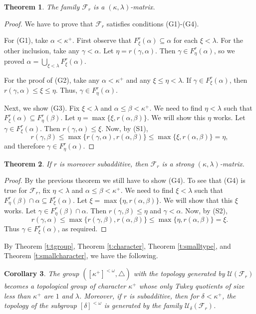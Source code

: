 \documentclass{amsart}
\theoremstyle{plain}
\newtheorem{theorem}{Theorem}[section]
\newtheorem{corollary}[theorem]{Corollary}
\theoremstyle{definition}
\numberwithin{equation}{section}
\renewcommand{\a}{\alpha}
\renewcommand{\b}{\beta}
\newcommand{\g}{\gamma}
\renewcommand{\d}{\delta}
\renewcommand{\k}{\kappa}
\renewcommand{\o}{\omega}
\renewcommand{\l}{\lambda}
\newcommand{\sst}{\subseteq}
\newcommand{\cu}{\mathcal U}
\begin{document}
\begin{theorem}\label{t:transitivegroup}
	The family $\mathcal F_r$ is a $(\k,\l)$-matrix.
\end{theorem}
\begin{proof}
	We have to prove that $\mathcal F_r$ satisfies conditions (G1)-(G4).
	
	For (G1), take $\a<\k^+$.
	First observe that $F^r_{\xi}(\a) \sst \a$ for each $\xi<\l$.
	For the other inclusion, take any $\g < \a$.
	Let $\eta=r(\g,\a)$.
	Then $\g \in F^r_{\eta}(\a)$, so we proved $\a=\bigcup_{\xi<\l}F^r_{\xi}(\a)$.
	
	For the proof of (G2), take any $\a < \k^+$ and any $\xi \leq \eta < \l$.
	If $\g \in F^r_{\xi}(\a)$, then $r(\g,\a) \leq \xi \leq \eta$.
	Thus, $\g \in F^r_{\eta}(\a)$.
	
	Next, we show (G3).
	Fix $\xi < \l$ and $\a \leq \b < \k^+$.
	We need to find $\eta < \l$ such that $F^r_{\xi}(\a) \sst F^r_{\eta}(\b)$.	
	Let $\eta = \max\{\xi,r(\a,\b)\}$.
	We will show this $\eta$ works.
	Let $\g \in F^r_{\xi}(\a)$.
	Then $r(\g,\a) \leq \xi$.
	Now, by (S1),
	$$
	r(\g,\b) \leq \max\{r(\g,\a),r(\a,\b)\} \leq \max\{\xi,r(\a,\b)\} = \eta,
	$$
	and therefore $\g \in F^r_{\eta}(\a)$.
\end{proof}

\begin{theorem}\label{t:subadditivegroup}
	If $r$ is moreover subadditive, then $\mathcal F_r$ is a strong $(\k,\l)$-matrix.
\end{theorem}
\begin{proof}
	By the previous theorem we still have to show (G4).
	To see that (G4) is true for $\mathcal F_r$, fix $\eta < \l$ and $\a \leq \b < \k^+$.
	We need to find $\xi < \l$ such that $F^r_{\eta}(\b) \cap \a \sst F^r_{\xi}(\a)$.
	Let $\xi = \max\{\eta,r(\a,\b)\}$.
	We will show that this $\xi$ works.
	Let $\g \in F^r_{\eta}(\b) \cap \a$.
	Then $r(\g,\b) \leq \eta$ and $\g < \a$. Now, by (S2),
	$$
	r(\g,\a) \leq \max\{r(\g,\b),r(\a,\b)\} \leq \max\{\eta, r(\a,\b)\} = \xi.
	$$
	Thus $\g \in F^r_{\xi}(\a)$, as required.
\end{proof}

By Theorem \ref{t:tgroup}, Theorem \ref{t:character}, Theorem \ref{t:smalltype}, and Theorem \ref{t:smallcharacter}, we have the following. 

\begin{corollary}\label{c:subadditive}
	The group $([\k^+]^{<\o}, \triangle)$ with the topology generated by $\cu(\mathcal F_r)$ becomes a topological group of character $\k^+$ whose only Tukey quotients of size less than $\k^+$ are $1$ and $\l$.
	Moreover, if $r$ is subadditive, then for $\d < \k^+$, the topology of the subgroup $[\d]^{<\o}$ is generated by the family $\cu_\d(\mathcal F_r)$.
\end{corollary}
\end{document}
